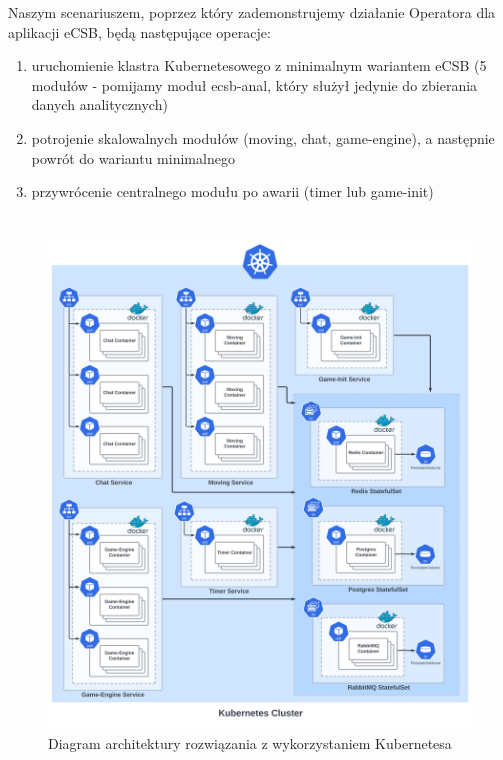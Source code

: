 \documentclass[polish]{aghengthesis}
\begin{document}
Naszym scenariuszem, poprzez który zademonstrujemy działanie Operatora dla aplikacji eCSB, będą następujące operacje:

\begin{enumerate}
    \item uruchomienie klastra Kubernetesowego z minimalnym wariantem eCSB (5 modułów - pomijamy moduł ecsb-anal, który służył jedynie do zbierania danych analitycznych)
    \item potrojenie skalowalnych modułów (moving, chat, game-engine), a następnie powrót do wariantu minimalnego
    \item przywrócenie centralnego modułu po awarii (timer lub game-init)
\end{enumerate}


\chapter{\ChapterTitleSolutionArchitecture}
\label{sec:architektura}

\begin{figure}[h!]
    \centering
    \includegraphics[width=0.9\linewidth]{resources/architecture_diagram.png}
    \caption{Diagram architektury rozwiązania z wykorzystaniem Kubernetesa}
    \label{fig:schema}
\end{figure}
\end{document}
